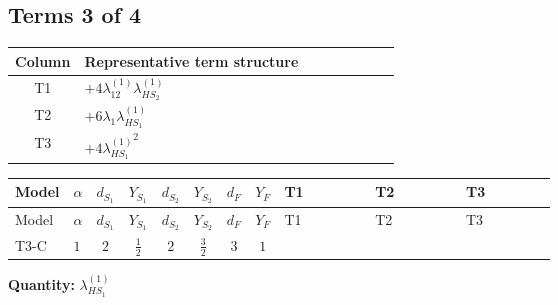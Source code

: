 \documentclass[8pt]{article}
\begin{document}
\begin{landscape}
\subsection*{Terms 3 of 4}
\begin{center}
\begin{tabular}{@{}c >{\raggedright\arraybackslash}p{0.82\linewidth}@{}}
\toprule
Column & Representative term structure \\
\midrule
T1 & \(\displaystyle +4 {\lambda_{12}^{(1)}} {\lambda_{HS_2}^{(1)}}\) \\
\midrule
T2 & \(\displaystyle +6 {\lambda_1} {\lambda_{HS_1}^{(1)}}\) \\
\midrule
T3 & \(\displaystyle +4 {\lambda_{HS_1}^{(1)}}^2\) \\
\midrule
\bottomrule
\end{tabular}
\end{center}
\smallskip
\tiny
\begin{longtable}{@{}llcccccc >{\raggedright\arraybackslash}p{0.21\linewidth} >{\raggedright\arraybackslash}p{0.21\linewidth} >{\raggedright\arraybackslash}p{0.21\linewidth}@{}}
\toprule
Model & $\alpha$ & $d_{S_1}$ & $Y_{S_1}$ & $d_{S_2}$ & $Y_{S_2}$ & $d_F$ & $Y_F$ & T1 & T2 & T3 \\
\midrule
\endfirsthead
\toprule
Model & $\alpha$ & $d_{S_1}$ & $Y_{S_1}$ & $d_{S_2}$ & $Y_{S_2}$ & $d_F$ & $Y_F$ & T1 & T2 & T3 \\
\midrule
\endhead
T3-C & $1$ & $2$ & $\frac{1}{2}$ & $2$ & $\frac{3}{2}$ & $3$ & $1$ & \scriptsize\adjustbox{max width=\linewidth}{$\begin{gathered} +4 {\lambda_{12}^{(1)}} {\lambda_{HS_2}^{(1)}}\end{gathered}$} & \scriptsize\adjustbox{max width=\linewidth}{$\begin{gathered} +6 {\lambda_1} {\lambda_{HS_1}^{(1)}}\end{gathered}$} & \scriptsize\adjustbox{max width=\linewidth}{$\begin{gathered} +4 {\lambda_{HS_1}^{(1)}}^2\end{gathered}$} \\
\midrule
\bottomrule
\end{longtable}
\clearpage
\noindent\textbf{Quantity: }$\lambda_{HS_1}^{(1)}$\par\smallskip

\end{landscape}
\end{document}
